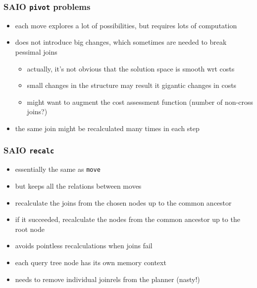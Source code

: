 \documentclass{beamer}
\begin{document}
\begin{frame}
  \frametitle{SAIO \texttt{pivot} problems}

  \begin{itemize}
  \item each move explores a lot of possibilities, but requires lots of
    computation
  \item does not introduce big changes, which sometimes are needed to break
    pessimal joins
    \begin{itemize}
    \item actually, it's not obvious that the solution space is smooth wrt
      costs
    \item small changes in the structure may result it gigantic changes in
      costs
    \item might want to augment the cost assessment function (number of
      non-cross joins?)
    \end{itemize}
  \item the same join might be recalculated many times in each step
  \end{itemize}
\end{frame}

\begin{frame}
  \frametitle{SAIO \texttt{recalc}}

  \begin{itemize}
  \item essentially the same as \texttt{move}
  \item but keeps all the relations  between moves
  \item recalculate the joins from the chosen nodes up to the common ancestor
  \item if it succeeded, recalculate the nodes from the common ancestor up to
    the root node
  \item avoids pointless recalculations when joins fail
  \item each query tree node has its own memory context
  \item needs to remove individual joinrels from the planner (nasty!)
  \end{itemize}
\end{frame}
\end{document}
